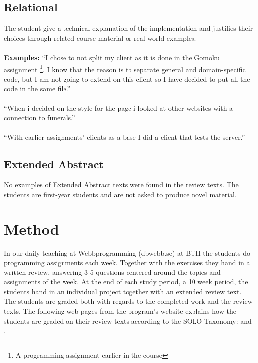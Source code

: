 \documentclass[twoside,twocolumn,a4paper,11pt,english]{article}
\begin{document}
\subsection{Relational}

The student give a technical explanation of the implementation and justifies their choices through related course material or real-world examples.
\\
\\
\textbf{Examples:} ``I chose to not split my client as it is done in the Gomoku assignment \footnote{A programming assignment earlier in the course}. I know that the reason is to separate general and domain-specific code, but I am not going to extend on this client so I have decided to put all the code in the same file.''
\\
\\
``When i decided on the style for the page i looked at other websites with a connection to funerals.''
\\
\\
``With earlier assignments' clients as a base I did a client that tests the server.''



\subsection{Extended Abstract}

No examples of Extended Abstract texts were found in the review texts. The students are first-year students and are not asked to produce novel material.




\section{Method}

In our daily teaching at Webbprogramming (dbwebb.se) at BTH the students do programming assignments each week. Together with the exercises they hand in a written review, answering 3-5 questions centered around the topics and assignments of the week. At the end of each study period, a 10 week period, the students hand in an individual project together with an extended review text. The students are graded both with regards to the completed work and the review texts. The following web pages from the program's website explains how the students are graded on their review texts according to the SOLO Taxonomy: \cite{redovisning} and \cite{solo}.
\end{document}
